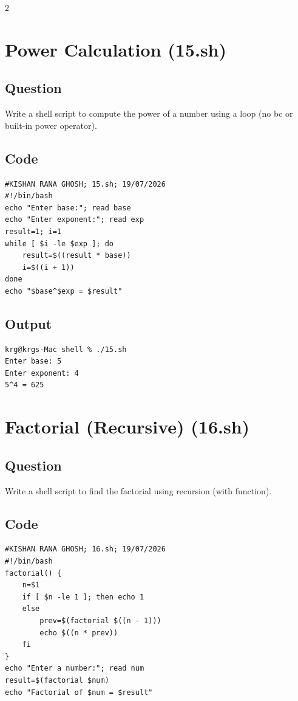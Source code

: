 \documentclass[a4paper,12pt]{article}
\begin{document}
\begin{multicols}{2}

\section{Power Calculation (15.sh)}
\subsection*{Question}
Write a shell script to compute the power of a number using a loop (no bc or built-in power operator).

\subsection*{Code}
\begin{lstlisting}[style=bashstyle]
#KISHAN RANA GHOSH; 15.sh; 19/07/2026
#!/bin/bash
echo "Enter base:"; read base
echo "Enter exponent:"; read exp
result=1; i=1
while [ $i -le $exp ]; do
    result=$((result * base))
    i=$((i + 1))
done
echo "$base^$exp = $result"
\end{lstlisting}

\subsection*{Output}
\begin{lstlisting}[style=outputstyle]
krg@krgs-Mac shell % ./15.sh
Enter base: 5
Enter exponent: 4
5^4 = 625
\end{lstlisting}

\columnbreak

\section{Factorial (Recursive) (16.sh)}
\subsection*{Question}
Write a shell script to find the factorial using recursion (with function).

\subsection*{Code}
\begin{lstlisting}[style=bashstyle]
#KISHAN RANA GHOSH; 16.sh; 19/07/2026
#!/bin/bash
factorial() {
    n=$1
    if [ $n -le 1 ]; then echo 1
    else
        prev=$(factorial $((n - 1)))
        echo $((n * prev))
    fi
}
echo "Enter a number:"; read num
result=$(factorial $num)
echo "Factorial of $num = $result"
\end{lstlisting}


\end{multicols}
\end{document}
